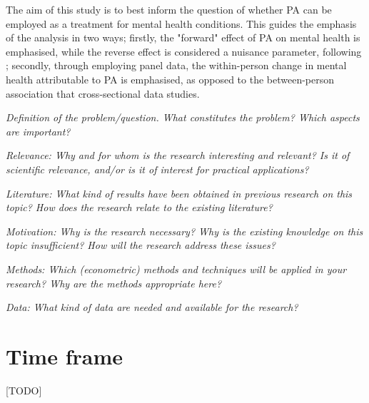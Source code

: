 \documentclass[a4paper,11pt]{report}
\begin{document}
The aim of this study is to best inform the question of whether PA can be employed as a treatment for mental health conditions.
This guides the emphasis of the analysis in two ways;
firstly, the "forward" effect of PA on mental health is emphasised, while the reverse effect is considered a nuisance parameter,
following ;
secondly, through employing panel data, the within-person change in mental health attributable to PA is emphasised,
as opposed to the between-person association that cross-sectional data studies.


\textit{Definition of the problem/question. What constitutes the problem? Which aspects are important?}

\textit{Relevance: Why and for whom is the research interesting and relevant? Is it of scientific relevance, and/or is it of interest for practical applications?}

\textit{Literature: What kind of results have been obtained in previous research on this topic? How does the research relate to the existing literature?}

\textit{Motivation: Why is the research necessary? Why is the existing knowledge on this topic insufficient? How will the research address these issues?}

\textit{Methods: Which (econometric) methods and techniques will be applied in your research? Why are the methods appropriate here?}

\textit{Data: What kind of data are needed and available for the research?}


\section*{Time frame}
[TODO]




\end{document}
